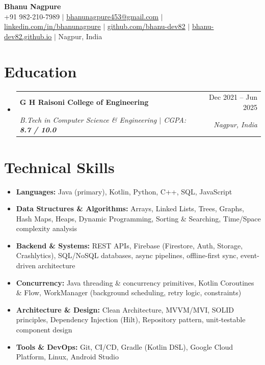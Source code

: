 \documentclass[letterpaper,11pt]{article}
\makeatletter
\newcommand{\resumeSubheading}[4]{%
  \item\vspace{3pt}
  \begin{tabular*}{\textwidth}[t]{@{}l@{\extracolsep{\fill}}r@{}}
    \textbf{#1} & \small{#2} \\
    \textit{\small #3} & \textit{\small #4} \\
  \end{tabular*}\vspace{-4pt}%
}
\newcommand{\resumeSubHeadingListStart}{%
  \begin{itemize}[leftmargin=0pt, label={}, itemsep=0pt, parsep=0pt, topsep=0pt]}
\newcommand{\resumeSubHeadingListEnd}{\end{itemize}\vspace{4pt}}
\makeatother
\begin{document}
\begin{center}
  {\Huge\bfseries Bhanu Nagpure}\\[5pt]
  \small
  +91 982-210-7989 \;$|$\;
  \href{mailto:bhanunagpure453@gmail.com}{\underline{bhanunagpure453@gmail.com}} \;$|$\;
  \href{https://linkedin.com/in/bhanunagpure}{\underline{linkedin.com/in/bhanunagpure}} \;$|$\;
  \href{https://github.com/bhanu-dev82}{\underline{github.com/bhanu-dev82}} \;$|$\;
  \href{https://bhanu-dev82.github.io}{\underline{bhanu-dev82.github.io}} \;$|$\;
  Nagpur, India
\end{center}

\section{Education}
\resumeSubHeadingListStart
  \resumeSubheading
    {G H Raisoni College of Engineering}{Dec 2021 -- Jun 2025}
    {B.Tech in Computer Science \& Engineering \;$|$\; CGPA: \textbf{8.7 / 10.0}}{Nagpur, India}
\resumeSubHeadingListEnd

\section{Technical Skills}
\begin{itemize}[leftmargin=0pt, label={}, itemsep=2.5pt, parsep=0pt, topsep=2pt]
  \item\small{\textbf{Languages:} Java (primary), Kotlin, Python, C++, SQL, JavaScript}
  \item\small{\textbf{Data Structures \& Algorithms:} Arrays, Linked Lists, Trees, Graphs, Hash Maps, Heaps, Dynamic Programming, Sorting \& Searching, Time/Space complexity analysis}
  \item\small{\textbf{Backend \& Systems:} REST APIs, Firebase (Firestore, Auth, Storage, Crashlytics), SQL/NoSQL databases, async pipelines, offline-first sync, event-driven architecture}
  \item\small{\textbf{Concurrency:} Java threading \& concurrency primitives, Kotlin Coroutines \& Flow, WorkManager (background scheduling, retry logic, constraints)}
  \item\small{\textbf{Architecture \& Design:} Clean Architecture, MVVM/MVI, SOLID principles, Dependency Injection (Hilt), Repository pattern, unit-testable component design}
  \item\small{\textbf{Tools \& DevOps:} Git, CI/CD, Gradle (Kotlin DSL), Google Cloud Platform, Linux, Android Studio}
\end{itemize}
\end{document}
